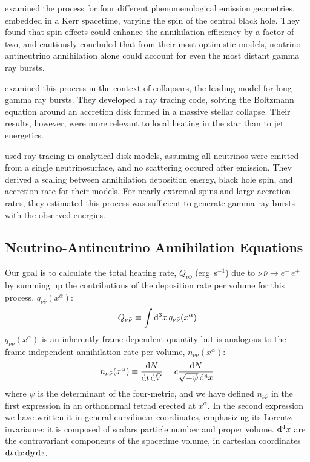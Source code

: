 \cite{birk2007-nunubar} examined the process for four different phenomenological
emission geometries, embedded in a Kerr spacetime, varying the spin of the
central black hole. They found that spin effects could enhance the annihilation
efficiency by a factor of two, and cautiously concluded that from their most
optimistic models, neutrino-antineutrino annihilation alone could account for
even the most distant gamma ray bursts.

\cite{hari2010-gr_nunubar_collapsar} examined this process in the context of
collapsars,
the leading model for long gamma ray bursts. They developed a ray tracing code,
solving the Boltzmann equation around an accretion disk formed in a massive
stellar collapse. Their results, however, were more relevant to local heating
in the star than to jet energetics.

\cite{zala2011-nunubar} used ray tracing in analytical disk models, assuming
all neutrinos were emitted from a single neutrinosurface, and no scattering
occured after emission. They derived a scaling between annihilation deposition
energy, black hole spin, and accretion rate for their models. For nearly
extremal spins and large accretion rates, they estimated this process was
sufficient to generate gamma ray bursts with the observed energies.

\subsection{Neutrino-Antineutrino Annihilation Equations}
\label{ssec:nunubar_integral}
Our goal is to calculate the total heating rate, $Q_{\nu \bar{\nu}}$ (erg~s$^{-1}$)
due to $\nu\,\bar{\nu} \rightarrow e^{-}\,e^{+}$ by summing up the contributions
of the deposition rate per volume for this process,
$q_{\nu \bar{\nu}}(x^\alpha)$:
\begin{equation}
  \label{eqn:Q_vol}
  Q_{\nu \bar{\nu}} \equiv \int \mathrm{d}^3 x\,q_{\nu \bar{\nu}}(x^\alpha)
\end{equation}
$q_{\nu \bar{\nu}}(x^\alpha)$ is an inherently frame-dependent quantity but is
analogous to the frame-independent annihilation rate per volume,
$n_{\nu \bar{\nu}}(x^\alpha)$:
\begin{equation}
  n_{\nu \bar{\nu}}(x^\alpha) \equiv
  \frac{\mathrm{d} N}{\mathrm{d} \bar{t} \, \mathrm{d} \bar{V}} =
  c \frac{\mathrm{d} N}{\sqrt{-\psi}\,\mathrm{d}^4 x}
\end{equation}
where $\psi$ is the determinant of the four-metric, and we have defined
$n_{\nu \bar{\nu}}$ in the first expression in an orthonormal tetrad erected at
$x^\alpha$. In the second expression we have written it in general curvilinear
coordinates, emphasizing its Lorentz invariance: it is composed of scalars
particle number and proper volume. $\mathrm{d}^4 x$ are the contravariant components
of the spacetime volume, in cartesian coordinates
$\mathrm{d} t \, \mathrm{d} x \, \mathrm{d} y \, \mathrm{d} z$.


